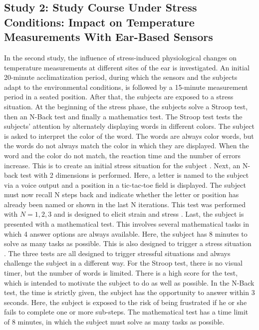 \subsection{Study 2: Study Course Under Stress Conditions: Impact on Temperature Measurements With Ear-Based Sensors}
\label{ch:design:study:study2}
In the second study, the influence of stress-induced physiological changes on temperature measurements at different sites of the ear is investigated. 
An initial 20-minute acclimatization period, during which the sensors and the subjects adapt to the environmental conditions, is followed by a 15-minute measurement period in a seated position.
After that, the subjects are exposed to a stress situation. 
At the beginning of the stress phase, the subjects solve a Stroop test, then an N-Back test and finally a mathematics test. 
The Stroop test tests the subjects' attention by alternately displaying words in different colors. 
The subject is asked to interpret the color of the word. The words are always color words, but the words do not always match the color in which they are displayed. 
When the word and the color do not match, the reaction time and the number of errors increase. 
This is to create an initial stress situation for the subject \cite{StroopCompetitionSocialEvaluative}. 
Next, an N-back test with 2 dimensions is performed. 
Here, a letter is named to the subject via a voice output and a position in a tic-tac-toe field is displayed. 
The subject must now recall N steps back and indicate whether the letter or position has already been named or shown in the last N iterations. 
This test was performed with $N={1,2,3}$ and is designed to elicit strain and stress \cite{liangEffectAcuteStress2023}.
Last, the subject is presented with a mathematical test. 
This involves several mathematical tasks in which 4 answer options are always available.
Here, the subject has 8 minutes to solve as many tasks as possible. 
This is also designed to trigger a stress situation \cite{caviolaStressTimePressure2017}.
The three tests are all designed to trigger stressful situations and always challenge the subject in a different way.
For the Stroop test, there is no visual timer, but the number of words is limited. 
There is a high score for the test, which is intended to motivate the subject to do as well as possible. 
In the N-Back test, the time is strictly given, the subject has the opportunity to answer within 3 seconds.
Here, the subject is exposed to the risk of being frustrated if he or she fails to complete one or more sub-steps.
The mathematical test has a time limit of 8 minutes, in which the subject must solve as many tasks as possible.
